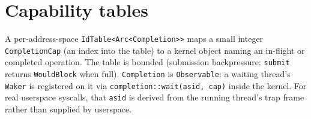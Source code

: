 \section{Capability tables}

A per-address-space \texttt{IdTable<Arc<Completion>>} maps a small integer
\texttt{CompletionCap} (an index into the table) to a kernel object naming an
in-flight or completed operation. The table is bounded (submission
backpressure: \texttt{submit} returns \texttt{WouldBlock} when full).
\texttt{Completion} is \texttt{Observable}: a waiting thread's \texttt{Waker}
is registered on it via \texttt{completion::wait(asid, cap)} inside the
kernel. For real userspace syscalls, that \texttt{asid} is derived from the
running thread's trap frame rather than supplied by userspace.

\endinput
